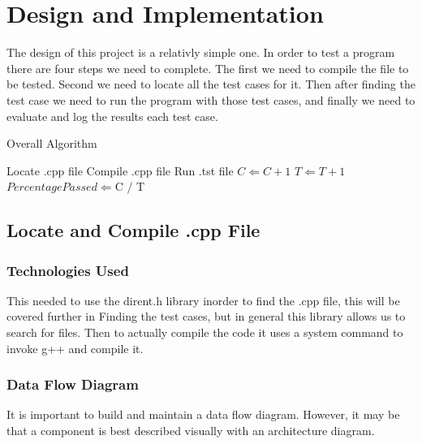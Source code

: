 \chapter{Design  and Implementation}
The design of this project is a relativly simple one.  In order to test a program there are four steps we need to complete.
The first we need to compile the file to be tested.  Second we need to locate all the test cases for it.  Then after finding the test case we need to run the program with those test cases, and finally we need to evaluate and log the results each test case.

\begin{algorithm} [tbh]              %
\caption{Overall Algorithm}
\label{algover}
\begin{algorithmic}
	\STATE Locate .cpp file
	\STATE Compile .cpp file
		\STATE Run .tst file
			\STATE $C \Leftarrow C + 1$
		\ENDIF
		\STATE $T \Leftarrow T + 1$
	\ENDWHILE
	\STATE $Percentage Passed \Leftarrow $C / T
\end{algorithmic}
\end{algorithm}
 

\section{Locate and Compile .cpp File}

\subsection{Technologies  Used}
This needed to use the dirent.h library inorder to find the .cpp file, this will be covered further in
Finding the test cases, but in general this library allows us to search for files.  Then to actually compile
the code it uses a system command to invoke g++ and compile it.

\subsection{Data Flow Diagram}
It is important to build and maintain a data flow diagram.  However, it may be 
that a component is best described visually with an architecture diagram. 


